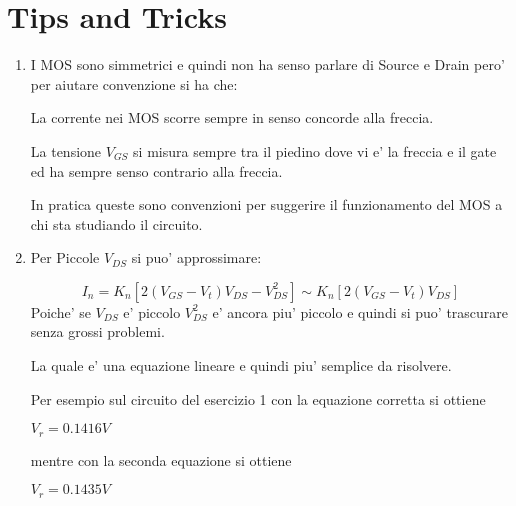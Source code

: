 \documentclass[\main/main.tex]{subfiles}
\begin{document}
\section{Tips and Tricks}
\begin{enumerate}
    \item I MOS sono simmetrici e quindi non ha senso parlare di Source e Drain pero' per aiutare convenzione si ha che:

          La corrente nei MOS scorre sempre in senso concorde alla freccia.

          La tensione $V_{GS}$ si misura sempre tra il piedino dove vi e' la freccia e il gate ed ha sempre senso contrario alla freccia.

          In pratica queste sono convenzioni per suggerire il funzionamento del MOS a chi sta studiando il circuito.

    \item Per Piccole $V_{DS}$ si puo' approssimare:

          \[I_n = K_n \left[ 2 \left( V_{GS} -V_t \right)V_{DS} - V_{DS}^2 \right] \sim K_n \left[ 2 \left( V_{GS} -V_t \right)V_{DS} \right]\]
          Poiche' se $V_{DS}$ e' piccolo $V_{DS}^2$ e' ancora piu' piccolo e quindi si puo' trascurare senza grossi problemi.

          La quale e' una equazione lineare e quindi piu' semplice da risolvere.

          Per esempio sul circuito del esercizio 1 con la equazione corretta si ottiene

          $V_r = 0.1416V$

          mentre con la seconda equazione si ottiene

          $V_r = 0.1435V$
\end{enumerate}
\end{document}
